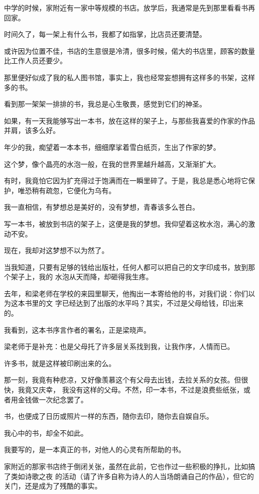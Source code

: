 
		中学的时候，家附近有一家中等规模的书店。放学后，我通常是先到那里看看书再回家。\par
		时间久了，每一架上有什么书，我都了如指掌，比店员还要清楚。\par
		或许因为位置不佳，书店的生意很是冷清，很多时候，偌大的书店里，顾客的数量比工作人员还要少。\par
		那里便好似成了我的私人图书馆，事实上，我也经常妄想拥有这样多的书架，这样多的书。\par
		看到那一架架一排排的书，我总是心生敬畏，感觉到它们的神圣。

		如果，有一天我能够写出一本书，放在这样的架子上，与那些我喜爱的作家的作品并肩，该多么好。

		年少的我，痴望着一本本书，细细摩挲着雪白纸页，生出了作家的梦。\par
		这个梦，像个晶亮的水泡一般，在我的世界里越升越高，又渐渐扩大。\par
		有时，我竟怕它因为扩充得过于饱满而在一瞬里碎了。于是，我总是悉心地将它保护，唯恐稍有疏忽，它便化为乌有。\par
		我一直相信，有梦想总是美好的，没有梦想，青春该多么苍白。

		写一本书，被放到书店的架子上，这便是我的梦想。我仰望着这枚水泡，满心的激动不安。\par
		现在，我却对这梦想不以为然了。

		当我知道，只要有足够的钱给出版社，任何人都可以把自己的文字印成书，放到那个架子上，我的
	水泡从天而降，却砸得我生疼。

		去年，和梁老师在学校的来园里聊天，他掏出一本寄给他的书，对我们说：你们以为这本书里的文
	字已经达到了出版的水平吗？其实，不过是父母给钱，印出来的。

		我看到，这本书序言作者的署名，正是梁晓声。\par
		梁老师于是补充：也是父母托了许多层关系找到我，让我作序，人情而已。

		许多书，就是这样被印刷出来的么。

		那一刻，我竟有种悲凉，又好像羡慕这个有父母去出钱，去拉关系的女孩。但很快，我竟又庆幸，
	我没有这样的父母。不然，印一本书，不过是浪费些纸张，或者用金钱做一次纪念罢了。

		书，也便成了日历或照片一样的东西，随你去印，随你去自娱自乐。\par
		我心中的书，却全不如此。\par
		我要写的，是一本真正的书，对他人的心灵有所帮助的书。

		家附近的那家书店终于倒闭关张，虽然在此前，它也作过一些积极的挣扎，比如搞了类如诗歌之夜
	的活动（请了许多自称为诗人的人当场朗诵自己的作品），但它的关门，还是成为了残酷的事实。

